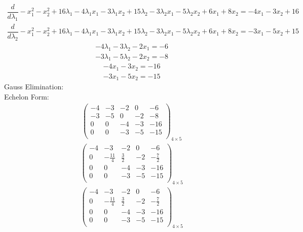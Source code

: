 \documentclass{article}
\begin{document}
\begin{align*}
\dfrac{d}{d\lambda_{1}}-x_{1}^{2} - x_{2}^{2} + 16\lambda_{1} - 4\lambda_{1}x_{1} - 3\lambda_{1}x_{2} + 15\lambda_{2} - 3\lambda_{2}x_{1} - 5\lambda_{2}x_{2} + 6x_{1} + 8x_{2}=-4x_{1} - 3x_{2} + 16\end{align*}
\begin{align*}
\dfrac{d}{d\lambda_{2}}-x_{1}^{2} - x_{2}^{2} + 16\lambda_{1} - 4\lambda_{1}x_{1} - 3\lambda_{1}x_{2} + 15\lambda_{2} - 3\lambda_{2}x_{1} - 5\lambda_{2}x_{2} + 6x_{1} + 8x_{2}=-3x_{1} - 5x_{2} + 15\end{align*}
\begin{align*}
-4\lambda_{1} - 3\lambda_{2} - 2x_{1}=-6\end{align*}
\begin{align*}
-3\lambda_{1} - 5\lambda_{2} - 2x_{2}=-8\end{align*}
\begin{align*}
-4x_{1} - 3x_{2}=-16\end{align*}
\begin{align*}
-3x_{1} - 5x_{2}=-15\end{align*}
Gauss Elimination:\\
Echelon Form:\\
\begin{align*}
\left(
\begin{array}{cccc|c}
-4 & -3 & -2 & 0 & -6\\
-3 & -5 & 0 & -2 & -8\\
0 & 0 & -4 & -3 & -16\\
0 & 0 & -3 & -5 & -15\\
\end{array}
\right)_{4\times 5}
\end{align*}
\begin{align*}
\left(
\begin{array}{cccc|c}
-4 & -3 & -2 & 0 & -6\\
0 & -\frac{11}{4} & \frac{3}{2} & -2 & -\frac{7}{2}\\
0 & 0 & -4 & -3 & -16\\
0 & 0 & -3 & -5 & -15\\
\end{array}
\right)_{4\times 5}
\end{align*}
\begin{align*}
\left(
\begin{array}{cccc|c}
-4 & -3 & -2 & 0 & -6\\
0 & -\frac{11}{4} & \frac{3}{2} & -2 & -\frac{7}{2}\\
0 & 0 & -4 & -3 & -16\\
0 & 0 & -3 & -5 & -15\\
\end{array}
\right)_{4\times 5}
\end{align*}
\end{document}
